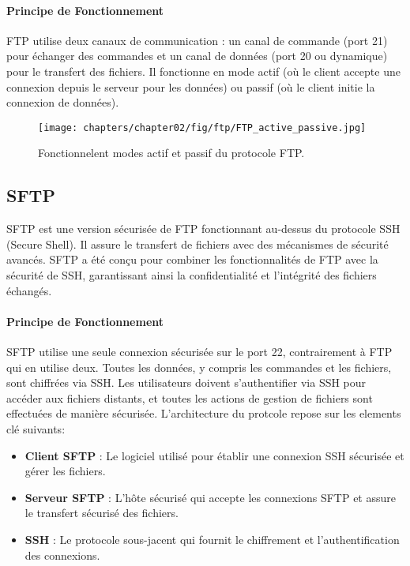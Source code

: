 \paragraph{Principe de Fonctionnement}
FTP utilise deux canaux de communication\cite{techtarget-2016} : un canal de commande (port 21) pour échanger des commandes et un canal de données (port 20 ou dynamique) pour le transfert des fichiers. Il fonctionne en mode actif (où le client accepte une connexion depuis le serveur pour les données) ou passif (où le client initie la connexion de données).

\begin{figure}[H]
    \centering
    \texttt{[image: chapters/chapter02/fig/ftp/FTP\_active\_passive.jpg]}
    \caption{Fonctionnelent modes actif et passif du protocole FTP.\cite{techtarget-2016}}
    \label{fig:gen}
\end{figure}

\subsection{SFTP}

SFTP est une version sécurisée de FTP fonctionnant au-dessus du protocole SSH (Secure Shell). Il assure le transfert de fichiers avec des mécanismes de sécurité avancés. SFTP a été conçu pour combiner les fonctionnalités de FTP avec la sécurité de SSH, garantissant ainsi la confidentialité et l'intégrité des fichiers échangés.

\paragraph{Principe de Fonctionnement}
SFTP utilise une seule connexion sécurisée sur le port 22, contrairement à FTP qui en utilise deux. Toutes les données, y compris les commandes et les fichiers, sont chiffrées via SSH. Les utilisateurs doivent s’authentifier via SSH pour accéder aux fichiers distants, et toutes les actions de gestion de fichiers sont effectuées de manière sécurisée. L'architecture du protcole repose sur les elements clé suivants: 
\begin{itemize}
    \item \textbf{Client SFTP} : Le logiciel utilisé pour établir une connexion SSH sécurisée et gérer les fichiers.
    \item \textbf{Serveur SFTP} : L'hôte sécurisé qui accepte les connexions SFTP et assure le transfert sécurisé des fichiers.
    \item \textbf{SSH} : Le protocole sous-jacent qui fournit le chiffrement et l’authentification des connexions.
\end{itemize}


